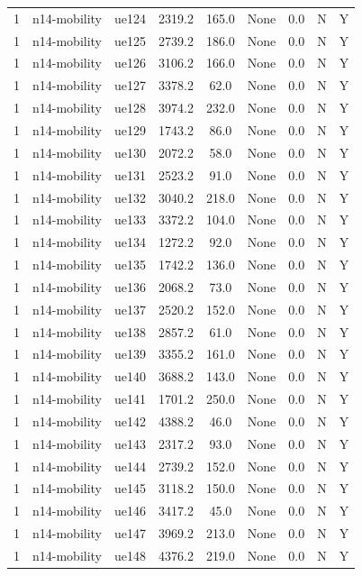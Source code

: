 \begin{table}[ht]
\begin{tabular}{|c|c|c|c|c|c|c|c|c|}
1 & n14-mobility & ue124 & 2319.2 & 165.0 & None & 0.0 & N & Y \\
1 & n14-mobility & ue125 & 2739.2 & 186.0 & None & 0.0 & N & Y \\
1 & n14-mobility & ue126 & 3106.2 & 166.0 & None & 0.0 & N & Y \\
1 & n14-mobility & ue127 & 3378.2 & 62.0 & None & 0.0 & N & Y \\
1 & n14-mobility & ue128 & 3974.2 & 232.0 & None & 0.0 & N & Y \\
1 & n14-mobility & ue129 & 1743.2 & 86.0 & None & 0.0 & N & Y \\
1 & n14-mobility & ue130 & 2072.2 & 58.0 & None & 0.0 & N & Y \\
1 & n14-mobility & ue131 & 2523.2 & 91.0 & None & 0.0 & N & Y \\
1 & n14-mobility & ue132 & 3040.2 & 218.0 & None & 0.0 & N & Y \\
1 & n14-mobility & ue133 & 3372.2 & 104.0 & None & 0.0 & N & Y \\
1 & n14-mobility & ue134 & 1272.2 & 92.0 & None & 0.0 & N & Y \\
1 & n14-mobility & ue135 & 1742.2 & 136.0 & None & 0.0 & N & Y \\
1 & n14-mobility & ue136 & 2068.2 & 73.0 & None & 0.0 & N & Y \\
1 & n14-mobility & ue137 & 2520.2 & 152.0 & None & 0.0 & N & Y \\
1 & n14-mobility & ue138 & 2857.2 & 61.0 & None & 0.0 & N & Y \\
1 & n14-mobility & ue139 & 3355.2 & 161.0 & None & 0.0 & N & Y \\
1 & n14-mobility & ue140 & 3688.2 & 143.0 & None & 0.0 & N & Y \\
1 & n14-mobility & ue141 & 1701.2 & 250.0 & None & 0.0 & N & Y \\
1 & n14-mobility & ue142 & 4388.2 & 46.0 & None & 0.0 & N & Y \\
1 & n14-mobility & ue143 & 2317.2 & 93.0 & None & 0.0 & N & Y \\
1 & n14-mobility & ue144 & 2739.2 & 152.0 & None & 0.0 & N & Y \\
1 & n14-mobility & ue145 & 3118.2 & 150.0 & None & 0.0 & N & Y \\
1 & n14-mobility & ue146 & 3417.2 & 45.0 & None & 0.0 & N & Y \\
1 & n14-mobility & ue147 & 3969.2 & 213.0 & None & 0.0 & N & Y \\
1 & n14-mobility & ue148 & 4376.2 & 219.0 & None & 0.0 & N & Y \\

\end{tabular}
\end{table}
